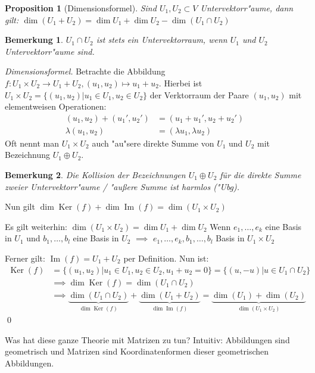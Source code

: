 \documentclass[11pt]{article}
\newcommand{\gq}[1]{\glqq{}#1\grqq{}} %
\DeclareMathOperator{\mKer}{Ker}
\DeclareMathOperator{\mIm}{Im}
\newtheorem*{proposition}{Proposition}
\newtheorem*{bem}{Bemerkung}
\begin{document}
\begin{proposition}[Dimensionsformel]
Sind \(U_1, U_2 \subset V\) Untervektorr"aume, dann gilt: \(\dim(U_1 +U_2) =\dim U_1 + \dim U_2 - \dim (U_1\cap U_2)\)
\end{proposition}
\begin{bem}
\(U_1\cap U_2\) ist stets ein Untervektorraum, wenn \(U_1\) und \(U_2\) Untervektorr"aume sind.
\end{bem}
\begin{proof}[Dimensionsformel] 

Betrachte die Abbildung \(f: U_1 \times U_2 \to U_1 + U_2, (u_1, u_2) \mapsto u_1 + u_2 \). Hierbei ist \(U_1\times U_2 = \{(u_1, u_2) | u_1 \in U_1, u_2 \in U_2 \} \) der Verktorraum der Paare \((u_1, u_2)\) mit
elementweisen Operationen:
\begin{align*}
(u_1, u_2) + (u_1', u_2') &= (u_1 + u_1', u_2 + u_2') \\
\lambda (u_1, u_2) &= (\lambda u_1, \lambda u_2)
\end{align*}
Oft nennt man \(U_1 \times U_2\) auch \gq{"au"sere direkte Summe} von \(U_1\) und \(U_2\) mit Bezeichnung \(U_1 \oplus U_2\).
\begin{bem}Die Kollision der
Bezeichnungen \(U_1\oplus U_2\) für die direkte Summe zweier Untervektorr"aume / "außere Summe ist harmlos ("Ubg).
\end{bem}

Nun gilt \(\dim \mKer(f) + \dim\mIm(f) = \dim(U_1\times U_2) \)

Es gilt weiterhin: \(\dim(U_1 \times U_2) = \dim U_1 + \dim U_2 \) Wenn \(e_1, \dots, e_k \) eine Basis in \(U_1\) und \(b_1, \dots, b_l \) eine Basis in \(U_2\) \(\implies\) \(e_1, \dots, e_k, b_1, \dots, b_l\) Basis in \(U_1\times U_2\)

Ferner gilt: \(\mIm(f) = U_1 + U_2\) per Definition. Nun ist:
\begin{align*}
\mKer(f) &= \{(u_1, u_2) | u_1 \in U_1, u_2\in U_2, u_1 + u_2 = 0\} = \{(u, -u)| u \in U_1 \cap U_2 \}\\
&\implies \dim\mKer (f) = \dim(U_1 \cap U_2)\\
&\implies \underbrace{\dim(U_1 \cap U_2)}_{\dim\mKer(f)} + \underbrace{\dim(U_1 + U_2)}_{\dim\mIm(f)} = \underbrace{\dim(U_1) + \dim(U_2)}_{\dim (U_1\times U_2)}
\end{align*}\qed
\end{proof}

Was hat diese ganze Theorie mit Matrizen zu tun? Intuitiv: Abbildungen sind
\gq{geometrisch} und Matrizen sind Koordinatenformen dieser geometrischen
Abbildungen.
\end{document}
